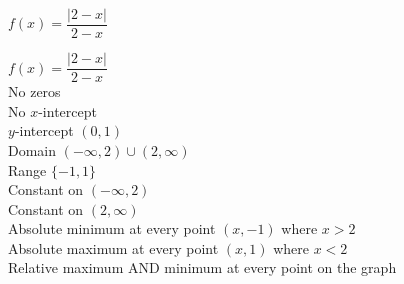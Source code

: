 {$f(x) = \dfrac{|2 - x|}{2 - x}$}
{$f(x) = \dfrac{|2 - x|}{2 - x}$ \\ No zeros \\ No $x$-intercept \\ $y$-intercept $(0, 1)$ \\ Domain $(-\infty, 2) \cup (2, \infty)$ \\ Range $\{-1, 1\}$ \\ Constant on $(-\infty, 2)$ \\ Constant on $(2, \infty)$ \\ Absolute minimum at every point $(x, -1)$ where $x > 2$ \\ Absolute maximum at every point $(x, 1)$ where $x < 2$ \\ Relative maximum AND minimum at every point on the graph

\begin{center}
\end{center}}